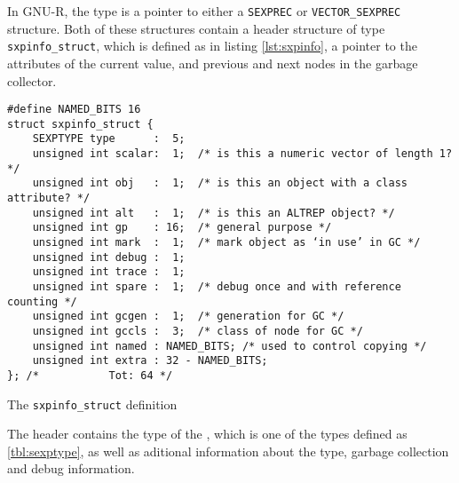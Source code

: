 In GNU-R, the type \SEXP is a pointer to either a \texttt{SEXPREC} or \texttt{VECTOR\_SEXPREC} structure. Both of these structures contain a header structure of type \texttt{sxpinfo\_struct}, which is defined as in listing \ref{lst:sxpinfo}, a pointer to the attributes of the current value, and previous and next nodes in the garbage collector.

\begin{listing}[h!]
	\begin{verbatim}
#define NAMED_BITS 16
struct sxpinfo_struct {
    SEXPTYPE type      :  5;
    unsigned int scalar:  1;  /* is this a numeric vector of length 1? */
    unsigned int obj   :  1;  /* is this an object with a class attribute? */
    unsigned int alt   :  1;  /* is this an ALTREP object? */
    unsigned int gp    : 16;  /* general purpose */
    unsigned int mark  :  1;  /* mark object as ‘in use’ in GC */
    unsigned int debug :  1;
    unsigned int trace :  1;
    unsigned int spare :  1;  /* debug once and with reference counting */
    unsigned int gcgen :  1;  /* generation for GC */
    unsigned int gccls :  3;  /* class of node for GC */
    unsigned int named : NAMED_BITS; /* used to control copying */
    unsigned int extra : 32 - NAMED_BITS;
}; /*		    Tot: 64 */
  \end{verbatim}
	\caption{The \texttt{sxpinfo\_struct} definition\cite[1.1.2 Rest of header]{rprojectInternals}}\label{lst:sxpinfo}
\end{listing}

The header contains the type of the \SEXP, which is one of the types defined as \ref{tbl:sexptype}, as well as aditional information about the type, garbage collection and debug information.


